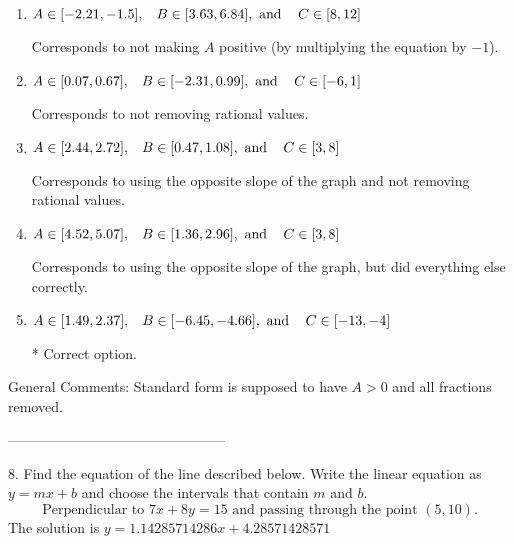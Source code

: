 \documentclass{article}[10pt]
\begin{document}
\begin{enumerate}[label=\Alph*.] 
\item $ A \in [-2.21, -1.5], \hspace{3mm} B \in [3.63, 6.84], \text{ and } \hspace{3mm} C \in [8, 12] $ 

  Corresponds to not making $A$ positive (by multiplying the equation by $-1$). 
\item $ A \in [0.07, 0.67], \hspace{3mm} B \in [-2.31, 0.99], \text{ and } \hspace{3mm} C \in [-6, 1] $ 

  Corresponds to not removing rational values. 
\item $ A \in [2.44, 2.72], \hspace{3mm} B \in [0.47, 1.08], \text{ and } \hspace{3mm} C \in [3, 8] $ 

  Corresponds to using the opposite slope of the graph and not removing rational values. 
\item $ A \in [4.52, 5.07], \hspace{3mm} B \in [1.36, 2.96], \text{ and } \hspace{3mm} C \in [3, 8] $ 

  Corresponds to using the opposite slope of the graph, but did everything else correctly. 
\item $ A \in [1.49, 2.37], \hspace{3mm} B \in [-6.45, -4.66], \text{ and } \hspace{3mm} C \in [-13, -4] $ 

 * Correct option. 
\end{enumerate} 
 
General Comments: Standard form is supposed to have $A > 0$ and all fractions removed.

-----------------------------------------------

8. Find the equation of the line described below. Write the linear equation as $ y=mx+b $ and choose the intervals that contain $m$ and $b$.
$$ \text{Perpendicular to } 7 x + 8 y = 15 \text{ and passing through the point } (5, 10). $$ 
The solution is $ y = 1.14285714286 x + 4.28571428571 $ 
\end{document}
